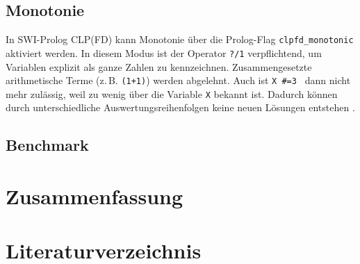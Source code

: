 \documentclass[12pt,a4paper]{article}
\begin{document}
\subsection{Monotonie}
\label{sec:monotonie}

In SWI-Prolog CLP(FD) kann Monotonie über die Prolog-Flag \texttt{clpfd\_monotonic} aktiviert werden.  
In diesem Modus ist der Operator \texttt{?/1} verpflichtend, um Variablen explizit als ganze Zahlen zu kennzeichnen.
Zusammengesetzte arithmetische Terme (z.\,B. \texttt{(1+1)}) werden abgelehnt.
Auch ist \texttt{X \#=3 } dann nicht mehr zulässig, weil zu wenig über die Variable \texttt{X} bekannt ist.   
Dadurch können durch unterschiedliche Auswertungsreihenfolgen keine neuen Lösungen entstehen \cite{swi-clpfd-doc}.
\subsection{Benchmark}
\label{sec:performance}
\section{Zusammenfassung}
\section{Literaturverzeichnis}
\renewcommand*{\bibname}{} %
\renewcommand*{\refname}{} %
\printbibliography
\end{document}
